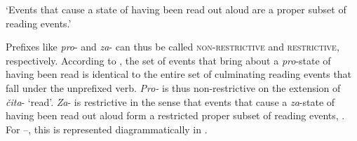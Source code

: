 \documentclass[output=paper,colorlinks,citecolor=brown]{langscibook}
\begin{document}
\glt    ‘Events that cause a state of having been read out aloud are a proper subset   of reading events.’\label{ex:tatevosov:100b}
\z
\z

\noindent Prefixes like \textit{pro}- and \textit{za}- can thus be called \textsc{non-restrictive} and \textsc{restrictive}, respectively. According to , the set of events that bring about a \textit{pro}-state of having been read is identical to the entire set of culminating reading events that fall under the unprefixed verb. \textit{Pro-} is thus non-restrictive on the extension of \textit{čita}- ‘read’. \textit{Za}- is restrictive in the sense that events that cause a \textit{za}-state of having been read out aloud form a restricted proper subset of reading events, . For --, this is represented diagrammatically in .
\end{document}
